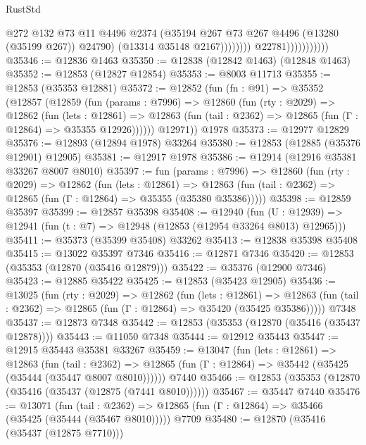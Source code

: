 \begin{lexlean}{RustStd}
\begin{coremodule}
                                        @272
                                        @132
                                        @73
                                        @11
                                        @4496
                                        @2374
                                        (@35194 @267 @73 @267 @4496 (@13280 (@35199 @267)) @24790)
                                        (@13314 @35148 @2167))))))))
                          @22781)))))))))))
@35346 := @12836 @1463
@35350 := @12838 (@12842 @1463) (@12848 @1463)
@35352 := @12853 (@12827 @12854)
@35353 := @8003 @11713
@35355 := @12853 (@35353 @12881)
@35372 := @12852
    (fun (fn : @91) =>
    @35352
      (@12857
        (@12859
          (fun (params : @7996) =>
          @12860
            (fun (rty : @2029) =>
            @12862
              (fun (lets : @12861) =>
              @12863 (fun (tail : @2362) => @12865 (fun (Γ : @12864) => @35355 @12926))))))
        @12971))
    @1978
@35373 := @12977 @12829
@35376 := @12893 (@12894 @1978) @33264
@35380 := @12853 (@12885 (@35376 @12901) @12905)
@35381 := @12917 @1978
@35386 := @12914 (@12916 @35381 @33267 @8007 @8010)
@35397 := fun (params : @7996) =>
  @12860
    (fun (rty : @2029) =>
    @12862
      (fun (lets : @12861) =>
      @12863 (fun (tail : @2362) => @12865 (fun (Γ : @12864) => @35355 (@35380 @35386)))))
@35398 := @12859 @35397
@35399 := @12857 @35398
@35408 := @12940
    (fun (U : @12939) => @12941 (fun (t : @7) => @12948 (@12853 (@12954 @33264 @8013) @12965)))
@35411 := @35373 (@35399 @35408) @33262
@35413 := @12838 @35398 @35408
@35415 := @13022 @35397 @7346
@35416 := @12871 @7346
@35420 := @12853 (@35353 (@12870 (@35416 @12879)))
@35422 := @35376 (@12900 @7346)
@35423 := @12885 @35422
@35425 := @12853 (@35423 @12905)
@35436 := @13025
    (fun (rty : @2029) =>
    @12862
      (fun (lets : @12861) =>
      @12863 (fun (tail : @2362) => @12865 (fun (Γ : @12864) => @35420 (@35425 @35386)))))
    @7348
@35437 := @12873 @7348
@35442 := @12853 (@35353 (@12870 (@35416 (@35437 @12878))))
@35443 := @11050 @7348
@35444 := @12912 @35443
@35447 := @12915 @35443 @35381 @33267
@35459 := @13047
    (fun (lets : @12861) =>
    @12863
      (fun (tail : @2362) =>
      @12865 (fun (Γ : @12864) => @35442 (@35425 (@35444 (@35447 @8007 @8010))))))
    @7440
@35466 := @12853 (@35353 (@12870 (@35416 (@35437 (@12875 (@7441 @8010))))))
@35467 := @35447 @7440
@35476 := @13071
    (fun (tail : @2362) => @12865 (fun (Γ : @12864) => @35466 (@35425 (@35444 (@35467 @8010)))))
    @7709
@35480 := @12870 (@35416 (@35437 (@12875 @7710)))

\end{coremodule}
\end{lexlean}
